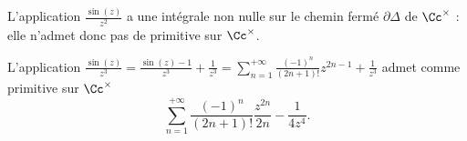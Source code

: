 {\begin{enumerate}
{  
  L'application $\frac{\sin(z)}{z^2}$ a une intégrale non nulle sur le chemin fermé $\partial\Delta$ de $\Cc^\times$ : elle n'admet donc pas de primitive sur $\Cc^\times$.
  
  
  L'application $\frac{\sin(z)}{z^3}=\frac{\sin(z)-1}{z^3}+\frac{1}{z^3}=\sum_{n=1}^{+\infty}\frac{(-1)^n}{(2n+1)!}z^{2n-1}+\frac{1}{z^3}$ 
  admet comme primitive sur $\Cc^\times$
  $$\sum_{n=1}^{+\infty}\frac{(-1)^n}{(2n+1)!}\frac{z^{2n}}{2n}-\frac{1}{4z^4}.$$}
\end{enumerate}
}